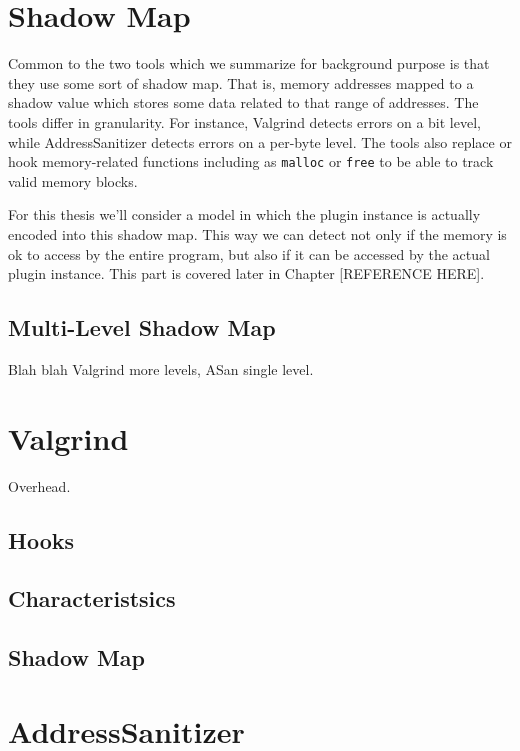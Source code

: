 \section {Shadow Map}

Common to the two tools which we summarize for background purpose is that they
use some sort of shadow map. That is, memory addresses mapped to a shadow value
which stores some data related to that range of addresses. The tools differ in
granularity. For instance, Valgrind detects errors on a bit level, while
AddressSanitizer detects errors on a per-byte level. The tools also replace or
hook memory-related functions including as \texttt{malloc} or \texttt{free} to
be able to track valid memory blocks.

For this thesis we'll consider a model in which the plugin instance is actually
encoded into this shadow map. This way we can detect not only if the memory is
ok to access by the entire program, but also if it can be accessed by the actual
plugin instance. This part is covered later in Chapter [REFERENCE HERE].

\subsection {Multi-Level Shadow Map}

Blah blah Valgrind more levels, ASan single level.


\section {Valgrind}

Overhead.

\subsection {Hooks}

\subsection {Characteristsics}

\subsection {Shadow Map}


\section {AddressSanitizer}


